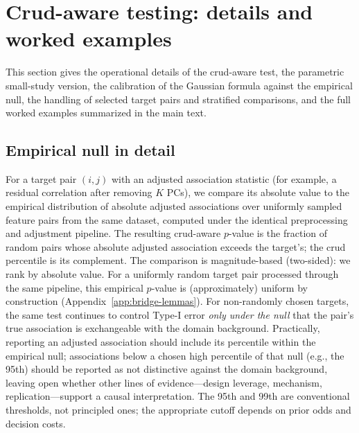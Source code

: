 \section{Crud-aware testing: details and worked examples}
\label{si:test-details}

This section gives the operational details of the crud-aware test, the parametric small-study version, the calibration of the Gaussian formula against the empirical null, the handling of selected target pairs and stratified comparisons, and the full worked examples summarized in the main text.

\subsection{Empirical null in detail}
\label{si:empirical-null-detail}

For a target pair $(i,j)$ with an adjusted association statistic (for example, a residual correlation after removing $K$ PCs), we compare its absolute value to the empirical distribution of absolute adjusted associations over uniformly sampled feature pairs from the same dataset, computed under the identical preprocessing and adjustment pipeline. The resulting crud-aware $p$-value is the fraction of random pairs whose absolute adjusted association exceeds the target's; the crud percentile is its complement. The comparison is magnitude-based (two-sided): we rank by absolute value. For a uniformly random target pair processed through the same pipeline, this empirical $p$-value is (approximately) uniform by construction (Appendix~\ref{app:bridge-lemmas}). For non-randomly chosen targets, the same test continues to control Type-I error \emph{only under the null} that the pair's true association is exchangeable with the domain background. Practically, reporting an adjusted association should include its percentile within the empirical null; associations below a chosen high percentile of that null (e.g., the 95th) should be reported as not distinctive against the domain background, leaving open whether other lines of evidence---design leverage, mechanism, replication---support a causal interpretation. The 95th and 99th are conventional thresholds, not principled ones; the appropriate cutoff depends on prior odds and decision costs.

